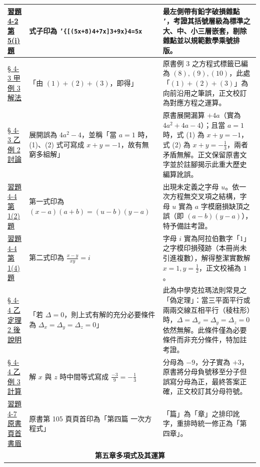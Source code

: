 \documentclass[a4paper,12pt,twoside]{article}
\begin{document}
\begin{table}[H]
\begin{tabularx}{\textwidth}{|p{3.0cm}|p{3.8cm}|X|}
\hyperref[item:ex4-2-5-1]{習題 4-2 第 5(i) 題} & 
式子印為 \texttt{'\{[(5x+8)4+7x]3+9x\}4=5x} & 
最左側帶有鉛字破損雜點 \texttt{'}，考證其括號層級為標準之大、中、小三層嵌套，剔除雜點並以規範數學乘號排版。 \\ \hline

\hyperref[ex:4-3-3]{§ 4-3 甲 例 3 解法} & 
「由 $(1)+(2)+(3)$，即得」 & 
原書例 3 之方程式標籤已編為 $(8), (9), (10)$，此處「$(1)+(2)+(3)$」為向前沿用之筆誤，正文校訂為對應方程之運算。 \\ \hline

\hyperref[ex:4-3-5]{§ 4-3 乙 例 2 討論} & 
展開誤為 $4a^2-4$，並稱「當 $a=1$ 時，(1)、(2) 式可寫成 $x+y=-1$，故有無窮多組解」 & 
原書展開漏算 $+4a$（實為 $4a^2+4a-4$）；且當 $a=1$ 時，式 (1) 為 $x+y=-1$，式 (2) 為 $x+y=-\frac{1}{3}$，兩者矛盾無解。正文保留原書文字並於註腳揭示此重大歷史編算訛誤。 \\ \hline

\hyperref[item:ex4-4-1-2]{習題 4-4 第 1(2) 題} & 
第一式印為 $(x-a)(a+b) = (u-b)(y-a)$ & 
出現未定義之字母 $u$。依一次方程無交叉項之結構，字母 $u$ 實為 $a$ 字模磨損缺頂之誤（即 $(a-b)(y-a)$），特予備註考證。 \\ \hline

\hyperref[item:ex4-4-1-4]{習題 4-4 第 1(4) 題} & 
第二式印為 $\frac{x-y}{xy} = i$ & 
字母 $i$ 實為阿拉伯數字「$1$」之字模印損殘跡（本冊尚未引進複數），解得整潔實數解 $x=1, y=\frac{1}{2}$，正文校補為 $1$。 \\ \hline

\hyperref[thm:cramer3]{§ 4-4 乙 定理 2 後說明} & 
「若 $\Delta=0$，則上式有解的充分必要條件為 $\Delta_x=\Delta_y=\Delta_z=0$」 & 
此為中學克拉瑪法則常見之「偽定理」：當三平面平行或兩兩交線互相平行（稜柱形）時，$\Delta=\Delta_x=\Delta_y=\Delta_z=0$ 依然無解。此條件僅為必要條件而非充分條件，特加註考證。 \\ \hline

\hyperref[ex:4-4-5]{§ 4-4 乙 例 3 計算} & 
解 $x$ 與 $z$ 時中間等式寫成 $\frac{-3}{9} = -\frac{1}{3}$ & 
分母為 $-9$，分子實為 $+3$，原書將分母負號移至分子但誤寫分母為正，最終答案正確，正文校訂其分母符號。 \\ \hline

\hyperref[sec:ex4-7]{習題 4-7 原書頁首書眉} & 
原書第 105 頁頁首印為「第四篇 一次方程式」 & 
「篇」為「章」之排印訛字，重排時統一修正為「第四章」。 \\ \hline

\multicolumn{3}{|c|}{\textbf{第五章\quad 多項式及其運算}} \\ \hline


\end{tabularx}
\end{table}
\end{document}
